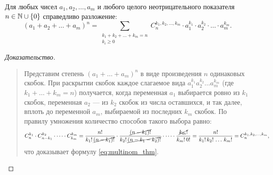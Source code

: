 \begin{theorem}
    Для любых чисел $a_1, a_2, \dots, a_m$ и любого целого неотрицательного 
    показателя $n \in \mathbb{N} \cup \{0\}$ справедливо разложение:
    \begin{equation} \label{eq:multinom_thm}
        (a_1 + a_2 + \dots + a_m)^n = 
        \sum_{\substack{k_1 + k_2 + \dots + k_m = n \\ k_i \ge 0}} 
        C_n^{k_1, k_2, \dots, k_m} \cdot 
        a_1^{k_1} \cdot a_2^{k_2} \cdot \dots \cdot a_m^{k_m}. \tag{17}
    \end{equation}
\end{theorem}

\begin{proof}[Доказательство]~\\
    \begin{quote}
        Представим степень $(a_1 + \dots + a_m)^n$ в виде произведения $n$ 
        одинаковых скобок. При раскрытии скобок каждое слагаемое вида 
        $a_1^{k_1} a_2^{k_2} \dots a_m^{k_m}$ (где $k_1 + \dots + k_m = n$) 
        получается, когда переменная $a_1$ выбирается ровно из $k_1$ скобок, 
        переменная $a_2$ --- из $k_2$ скобок из числа оставшихся, и так 
        далее, вплоть до переменной $a_m$, выбираемой из последних $k_m$ 
        скобок. По правилу умножения количество способов такого выбора равно:
        \[
            C_n^{k_1} \cdot C_{n-k_1}^{k_2} \cdot \dots \cdot C_{k_m}^{k_m} = 
            \frac{n!}{k_1! \, \cancel{(n - k_1)!}} \cdot 
            \frac{\cancel{(n - k_1)!}}{k_2! \, \cancel{(n - k_1 - k_2)!}} 
            \cdot \dots \cdot \frac{\cancel{k_m!}}{k_m! \, 0!} = 
            \frac{n!}{k_1! \, k_2! \, \dots \, k_m!} = 
            C_n^{k_1, k_2, \dots, k_m},
        \]
        что доказывает формулу \eqref{eq:multinom_thm}.
    \end{quote}
\end{proof}